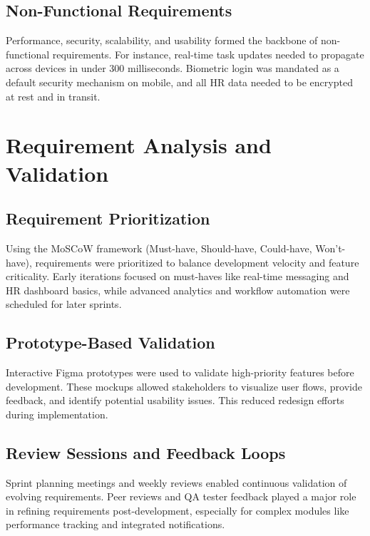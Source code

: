 \subsection{Non-Functional Requirements}

Performance, security, scalability, and usability formed the backbone of non-functional requirements. For instance, real-time task updates needed to propagate across devices in under 300 milliseconds. Biometric login was mandated as a default security mechanism on mobile, and all HR data needed to be encrypted at rest and in transit.

\section{Requirement Analysis and Validation}

\subsection{Requirement Prioritization}

Using the MoSCoW framework (Must-have, Should-have, Could-have, Won’t-have), requirements were prioritized to balance development velocity and feature criticality. Early iterations focused on must-haves like real-time messaging and HR dashboard basics, while advanced analytics and workflow automation were scheduled for later sprints.

\subsection{Prototype-Based Validation}

Interactive Figma prototypes were used to validate high-priority features before development. These mockups allowed stakeholders to visualize user flows, provide feedback, and identify potential usability issues. This reduced redesign efforts during implementation.

\subsection{Review Sessions and Feedback Loops}

Sprint planning meetings and weekly reviews enabled continuous validation of evolving requirements. Peer reviews and QA tester feedback played a major role in refining requirements post-development, especially for complex modules like performance tracking and integrated notifications.

